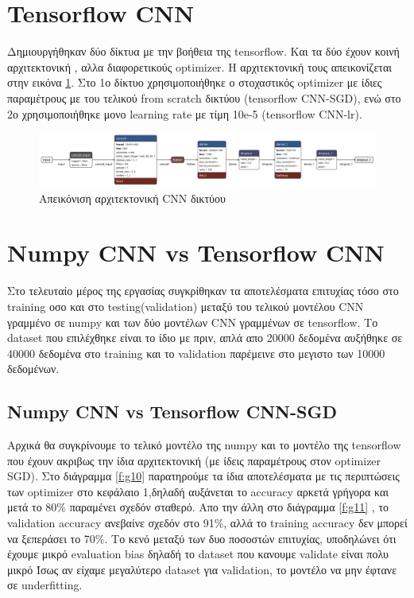 \section{Tensorflow CNN}

Δημιουργήθηκαν δύο δίκτυα με την βοήθεια της tensorflow. Και τα δύο έχουν κοινή αρχιτεκτονική , αλλα διαφορετικούς optimizer.
Η αρχιτεκτονική τους απεικονίζεται στην εικόνα \ref{f:g9}. Στο 1ο δίκτυο χρησιμοποιήθηκε ο στοχαστικός optimizer με ίδιες παραμέτρους με του τελικού from scratch δικτύου (tensorflow CNN-SGD), ενώ στο 2ο χρησιμοποιήθηκε μονο learning rate με τίμη 10e-5 (tensorflow CNN-lr).


\begin{figure}[ht]
	\centering
	\includegraphics[width=1\linewidth]{Results/tensor.h5.png}
	\caption{ Απεικόνιση αρχιτεκτονική CNN δικτύου}
	\label{f:g9}	
\end{figure}
\clearpage

\section{Numpy CNN vs Tensorflow CNN}

Στο τελευταίο μέρος της εργασίας συγκρίθηκαν τα αποτελέσματα επιτυχίας τόσο στο training οσο και στο testing(validation) μεταξύ του τελικού μοντέλου CNN γραμμένο σε numpy και των δύο μοντέλων CNN γραμμένων σε tensorflow. Το dataset που επιλέχθηκε είναι το ίδιο με πριν, απλά απο 20000 δεδομένα αυξήθηκε σε 40000 δεδομένα στο training και το validation παρέμεινε στο μεγιστο των 10000 δεδομένων.

\subsection{Numpy CNN vs Tensorflow CNN-SGD}

Αρχικά θα συγκρίνουμε το τελικό μοντέλο της numpy και το μοντέλο της tensorflow που έχουν ακριβως την ίδια αρχιτεκτονική (με ίδεις παραμέτρους στον optimizer SGD). Στο διάγραμμα \ref{f:g10} παρατηρούμε τα ίδια αποτελέσματα με τις περιπτώσεις των optimizer στο κεφάλαιο 1,δηλαδή αυξάνεται το accuracy αρκετά γρήγορα και μετά το 80$\%$ παραμένει σχεδόν σταθερό. Απο την άλλη στο διάγραμμα \ref{f:g11} , το validation accuracy ανεβαίνε σχεδόν στο 91$\%$, αλλά το training accuracy δεν μπορεί να ξεπεράσει το 70$\%$. Το κενό μεταξύ των δυο ποσοστών επιτυχίας, υποδηλώνει ότι έχουμε μικρό evaluation bias δηλαδή το dataset που κανουμε validate είναι πολυ μικρό Ίσως αν είχαμε μεγαλύτερο dataset για validation, το μοντέλο να μην έφτανε σε underfitting.

